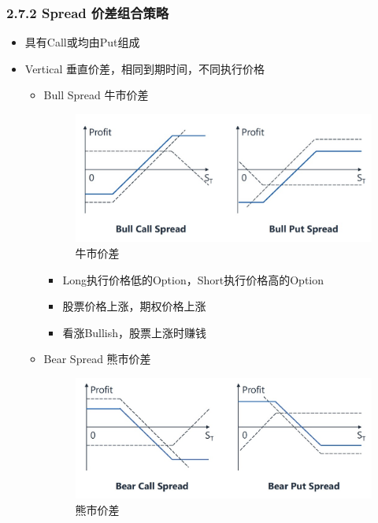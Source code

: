 \documentclass[a4paper,6pt,twoside,openany]{article}
\begin{document}
\subsubsection*{2.7.2 Spread 价差组合策略}
\begin{itemize}
\item 具有Call或均由Put组成
\item Vertical 垂直价差，相同到期时间，不同执行价格
  \begin{itemize}
  \item Bull Spread 牛市价差
    \begin{figure}[!htbp]
      \centering \includegraphics[width=150mm]{Strategy_Bull_Spread.jpg}
      \caption{牛市价差}
    \end{figure}
    \begin{itemize}
    \item Long执行价格低的Option，Short执行价格高的Option
    \item 股票价格上涨，期权价格上涨
    \item 看涨Bullish，股票上涨时赚钱
    \end{itemize}
  \item Bear Spread 熊市价差
    \begin{figure}[!htbp]
      \centering \includegraphics[width=150mm]{Strategy_Bear_Spread.jpg}
      \caption{熊市价差}
    \end{figure}
    \begin{itemize}

\end{itemize}
\end{itemize}
\end{itemize}
\end{document}

